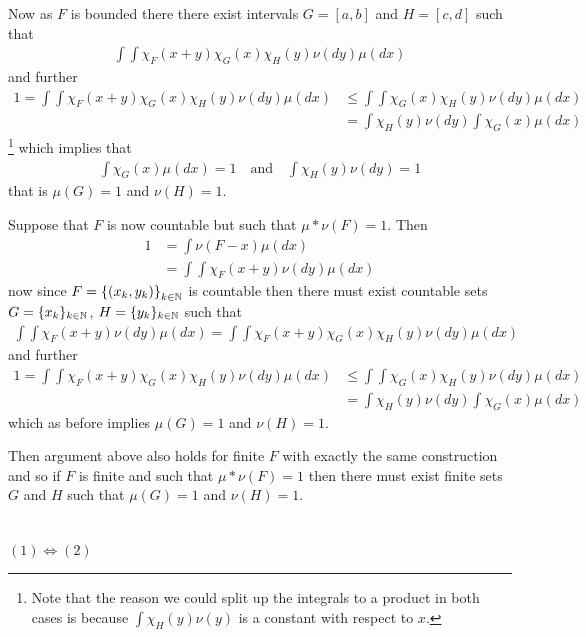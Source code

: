 \documentclass{unswmaths}
\begin{document}
Now as $ F $ is bounded there there exist intervals $ G = [a,b] $ and $ H = [c,d]$ such that
\begin{align}
	\int\int \chi_F(x+y) \chi_G(x) \chi_H(y) \nu(dy) \mu(dx)
\end{align}
and further
\begin{align}
	1=\int\int \chi_F(x+y) \chi_G(x) \chi_H(y) \nu(dy)\mu(dx) & \leq \int\int  \chi_G(x) \chi_H(y) \nu(dy) \mu(dx) \\
	&= \int \chi_{H}(y) \nu(dy) \int  \chi_G(x) \mu(dx)
\end{align}
\footnote{Note that the reason we could split up the integrals to a product in both cases is because $ \int \chi_H(y) \nu(y) $ is a constant with respect to $ x $.}
which implies that
\begin{align}
\int  \chi_G(x) \mu(dx) = 1 \ \ \ \text{ and } \ \ \ \int \chi_{H}(y) \nu(dy) = 1
\end{align}
that is $ \mu(G) = 1 $ and $ \nu(H) = 1 $.


Suppose that $ F $ is now countable but such that $ \mu * \nu (F) = 1 $.
Then
\begin{align}
	1 &= \int \nu(F - x) \mu(dx) \\
		&= \int \int \chi_{F}(x+y) \nu(dy) \mu(dx)
\end{align}
now since $ F = \left\{(x_k, y_k) \right\}_{k \in \mathbb{N}}$ is countable then there must exist countable sets $ G = \{ x_k \}_{k\in\mathbb{N}} $, $ H = \{ y_k \}_{k\in\mathbb{N}} $
such that
\begin{align}
	\int\int \chi_F(x+y) \nu(dy)\mu(dx) = \int\int \chi_F(x+y) \chi_G(x) \chi_H(y) \nu(dy)\mu(dx)
\end{align}
and further
\begin{align}
	1 = \int\int \chi_F(x+y) \chi_G(x) \chi_H(y) \nu(dy)\mu(dx) &\leq \int\int \chi_G(x) \chi_H(y) \nu(dy)\mu(dx) \\
	&= \int \chi_H(y) \nu(dy) \int \chi_G(x)\mu(dx)
\end{align}
which as before implies $ \mu(G) = 1 $ and $ \nu(H) = 1 $.

Then argument above also holds for finite $ F $ with exactly the same construction and so if $ F $ is finite and such that $ \mu * \nu(F) = 1 $ then there must exist finite sets $ G $ and $ H $ such that $ \mu(G) = 1 $ and $ \nu(H) = 1 $.
\section{}
\subsection{}
$ (1) \Leftrightarrow (2) $
\end{document}
